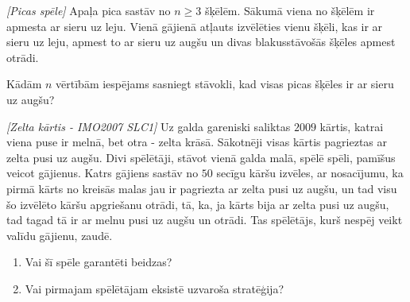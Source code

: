 \begin{problem}
\textit{[Picas spēle]}
Apaļa pica sastāv no  $n\ge3$ šķēlēm. Sākumā viena no šķēlēm ir apmesta ar sieru uz leju. Vienā gājienā atļauts izvēlēties vienu šķēli, kas ir ar sieru uz leju, apmest to ar sieru uz augšu un divas blakusstāvošās šķēles apmest otrādi.

Kādām $n$ vērtībām iespējams sasniegt stāvokli, kad visas picas šķēles ir ar sieru uz augšu?
\end{problem}
%

\begin{problem}
\textit{[Zelta kārtis - IMO2007 SLC1]}
Uz galda gareniski saliktas $2009$ kārtis, katrai viena puse ir melnā, bet otra - zelta krāsā. Sākotnēji visas kārtis pagrieztas ar zelta pusi uz augšu. Divi spēlētāji, stāvot vienā galda malā, spēlē spēli, pamīšus veicot gājienus. Katrs gājiens sastāv no $50$ secīgu kāršu izvēles, ar nosacījumu, ka pirmā kārts no kreisās malas jau ir pagriezta ar zelta pusi uz augšu, un tad visu šo izvēlēto kāršu apgriešanu otrādi, tā, ka, ja kārts bija ar zelta pusi uz augšu, tad tagad tā ir ar melnu pusi uz augšu un otrādi. Tas spēlētājs, kurš nespēj veikt valīdu gājienu, zaudē.
\begin{enumerate}
\item Vai šī spēle garantēti beidzas?
\item Vai pirmajam spēlētājam eksistē uzvaroša stratēģija?
\end{enumerate}
\end{problem}
%



